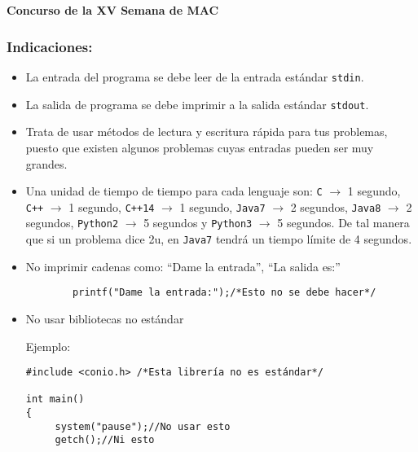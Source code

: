 \chapter*{}
\vspace{-1cm}
\begin{center}
    \Huge \bf Concurso de la XV Semana de MAC
\end{center}

\bigskip

\subsection*{Indicaciones:}

\begin{itemize}

	\item La entrada del programa se debe leer de la entrada estándar \texttt{stdin}.
    
    \item La salida de programa se debe imprimir a la salida estándar \texttt{stdout}.
    
    \item Trata de usar métodos de lectura y escritura rápida para tus problemas, puesto que existen algunos problemas cuyas entradas pueden ser muy grandes.
    
    \item Una unidad de tiempo de tiempo para cada lenguaje son: \texttt{C} $\rightarrow$ 1 segundo, \texttt{C++} $\rightarrow$ 1 segundo, \texttt{C++14} $\rightarrow$ 1 segundo, \texttt{Java7} $\rightarrow$ 2 segundos, \texttt{Java8} $\rightarrow$ 2 segundos, \texttt{Python2} $\rightarrow$ 5 segundos y \texttt{Python3} $\rightarrow$ 5 segundos. De tal manera que si un problema dice 2u, en \texttt{Java7} tendrá un tiempo límite de 4 segundos.
   	
    \item No imprimir cadenas como: ``Dame la entrada'', ``La salida es:''
    \begin{verbatim}
		printf("Dame la entrada:");/*Esto no se debe hacer*/
	\end{verbatim}
    
    \item No usar bibliotecas no estándar
  	
    Ejemplo:
    
    \begin{verbatim}
#include <conio.h> /*Esta librería no es estándar*/

int main()
{
     system("pause");//No usar esto
     getch();//Ni esto
    

\end{verbatim}
\end{itemize}

